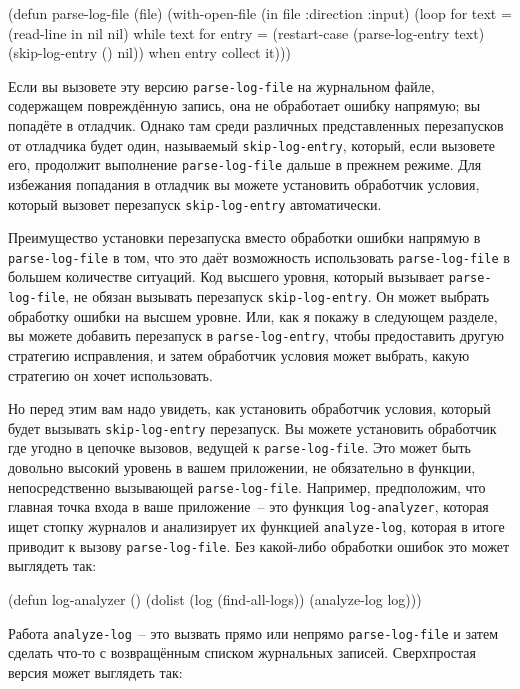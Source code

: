 \begin{myverb}
(defun parse-log-file (file)
  (with-open-file (in file :direction :input)
    (loop for text = (read-line in nil nil) while text
       for entry = (restart-case (parse-log-entry text)
                     (skip-log-entry () nil))
       when entry collect it)))
\end{myverb}

Если вы вызовете эту версию \lstinline{parse-log-file} на журнальном файле, содержащем
повреждённую запись, она не обработает ошибку напрямую; вы попадёте в отладчик. Однако
там среди различных представленных перезапусков от отладчика будет один, называемый
\lstinline{skip-log-entry}, который, если вызовете его, продолжит выполнение
\lstinline{parse-log-file} дальше в прежнем режиме. Для избежания попадания в отладчик вы
можете установить обработчик условия, который вызовет перезапуск \lstinline{skip-log-entry}
автоматически.

Преимущество установки перезапуска вместо обработки ошибки напрямую в
\lstinline{parse-log-file} в том, что это даёт возможность использовать \lstinline{parse-log-file} в
большем количестве ситуаций. Код высшего уровня, который вызывает \lstinline{parse-log-file},
не обязан вызывать перезапуск \lstinline{skip-log-entry}. Он может выбрать обработку ошибки на
высшем уровне. Или, как я покажу в следующем разделе, вы можете добавить перезапуск в
\lstinline{parse-log-entry}, чтобы предоставить другую стратегию исправления, и затем обработчик
условия может выбрать, какую стратегию он хочет использовать.

Но перед этим вам надо увидеть, как установить обработчик условия, который будет вызывать
\lstinline{skip-log-entry} перезапуск. Вы можете установить обработчик где угодно в
цепочке вызовов, ведущей к \lstinline{parse-log-file}. Это может быть довольно высокий
уровень в вашем приложении, не обязательно в функции, непосредственно вызывающей
\lstinline{parse-log-file}. Например, предположим, что главная точка входа в ваше
приложение~-- это функция \lstinline{log-analyzer}, которая ищет стопку журналов и
анализирует их функцией \lstinline{analyze-log}, которая в итоге приводит к вызову
\lstinline{parse-log-file}. Без какой-либо обработки ошибок это может выглядеть так:

\begin{myverb}
(defun log-analyzer ()
  (dolist (log (find-all-logs))
    (analyze-log log)))
\end{myverb}

Работа \lstinline{analyze-log}~-- это вызвать прямо или непрямо \lstinline{parse-log-file} и затем
сделать что-то с возвращённым списком журнальных записей. Сверхпростая версия может
выглядеть так:

